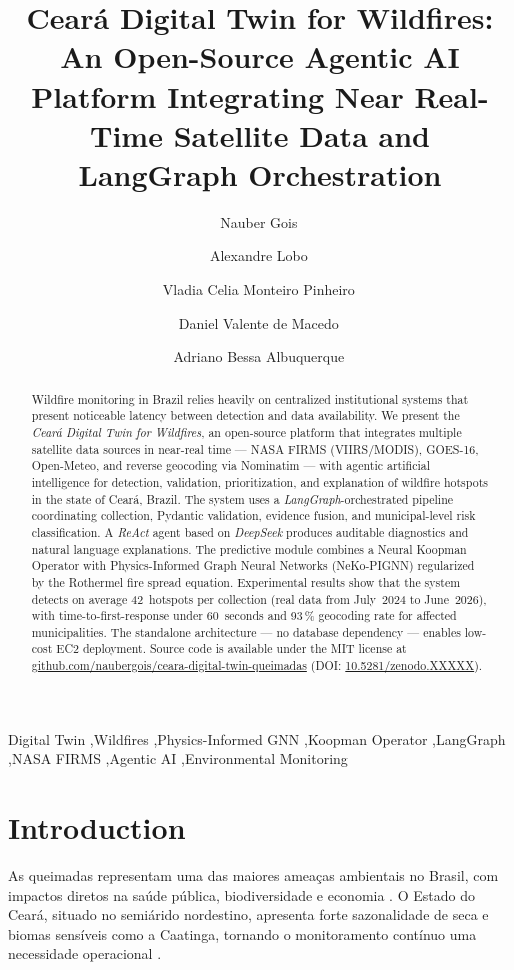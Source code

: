 \documentclass[preprint,times,numbers]{elsarticle}
\title{Cear\'{a} Digital Twin for Wildfires: An Open-Source Agentic AI Platform Integrating Near Real-Time Satellite Data and LangGraph Orchestration}
\author[unifor,cor1]{Nauber Gois\corref{cor1}\,\orcidlink{0000-0001-9361-8659}}
\author[usj]{Alexandre Lobo\,\orcidlink{0009-0000-4099-7878}}
\author[ifce]{Vladia Celia Monteiro Pinheiro\,\orcidlink{0000-0002-9851-8304}}
\author[saxion]{Daniel Valente de Macedo\,\orcidlink{0000-0003-4720-6850}}
\author[unifor]{Adriano Bessa Albuquerque\,\orcidlink{0000-0002-1491-655X}}
\begin{document}
\begin{frontmatter}

\begin{abstract}
Wildfire monitoring in Brazil relies heavily on centralized institutional systems that present noticeable latency between detection and data availability. We present the \emph{Cear\'{a} Digital Twin for Wildfires}, an open-source platform that integrates multiple satellite data sources in near-real time --- NASA FIRMS (VIIRS/MODIS), GOES-16, Open-Meteo, and reverse geocoding via Nominatim --- with agentic artificial intelligence for detection, validation, prioritization, and explanation of wildfire hotspots in the state of Cear\'{a}, Brazil. The system uses a \emph{LangGraph}-orchestrated pipeline coordinating collection, Pydantic validation, evidence fusion, and municipal-level risk classification. A \emph{ReAct} agent based on \emph{DeepSeek} produces auditable diagnostics and natural language explanations. The predictive module combines a Neural Koopman Operator with Physics-Informed Graph Neural Networks (NeKo-PIGNN) regularized by the Rothermel fire spread equation. Experimental results show that the system detects on average 42~hotspots per collection (real data from July~2024 to June~2026), with time-to-first-response under 60~seconds and 93\,\% geocoding rate for affected municipalities. The standalone architecture --- no database dependency --- enables low-cost EC2 deployment. Source code is available under the MIT license at \href{https://github.com/naubergois/ceara-digital-twin-queimadas}{github.com/naubergois/ceara-digital-twin-queimadas} (DOI: \href{https://doi.org/10.5281/zenodo.XXXXX}{10.5281/zenodo.XXXXX}).
\end{abstract}

\begin{keyword}
Digital Twin \sep Wildfires \sep Physics-Informed GNN \sep Koopman Operator \sep LangGraph \sep NASA FIRMS \sep Agentic AI \sep Environmental Monitoring
\end{keyword}

\end{frontmatter}

\section{Introduction}
\label{sec:intro}

As queimadas representam uma das maiores ameaças ambientais no Brasil, com impactos diretos na saúde pública, biodiversidade e economia \cite{article:alencar2020,master:silva2021}. O Estado do Ceará, situado no semiárido nordestino, apresenta forte sazonalidade de seca e biomas sensíveis como a Caatinga, tornando o monitoramento contínuo uma necessidade operacional \cite{techreport:funceme2024}.
\end{document}
